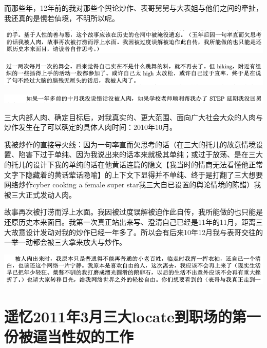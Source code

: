 \documentclass[9pt, b5paper]{article}
\begin{document}
而那些年，12年前的我对那些个舆论炒作、表哥舅舅与大表姐与他们之间的牵扯，我还真的是愰若仙境，不明所以呢。

\begin{center}
\includegraphics[width=.9\linewidth]{./pic/p1p32-6.png}
\end{center}

\begin{center}
\includegraphics[width=.9\linewidth]{./pic/p1p40-2.png}
\end{center}

\begin{center}
\includegraphics[width=.9\linewidth]{./pic/p1p70-1.png}
\end{center}

三大内部人肉、确定目标后，对我真实的、更大范围、面向广大社会大众的人肉与炒作发生在了可以确定的具体人肉时间：2010年10月。

我被炒作的直接导火线：因为一句率直而欠思考的话（在三大的托儿的故意情境设置、陷害下过于单纯、因为我说出来的话本来就极其单纯；或过于放荡、是在三大的托儿的设计下我的单纯的话在他黄话连篇的隐文【我当时的情商无法看懂他正常文字下隐藏着的黄话荤话隐喻】的上下文下显得并不单纯、终于是打翻了三大想要网络炒作cyber cooking a female super star我三大自已设置的舆论情境的陈醋）我被三大正式发动人肉。

故事再次被打涝而浮上水面。我因被过度误解被迫作此自传，我所能做的也只能是还原历史本来面目。我第一次真正站出来写、澄清自己已经是11年的11月，距离三大故意设计发动对我的炒作已经一年多了。所以会有后来10年12月我与表哥交往的一举一动都会被三大拿来放大与炒作。 

\begin{center}
\includegraphics[width=.9\linewidth]{./pic/p1p165.png}
\end{center}

\section{遥忆2011年3月三大locate到职场的第一份被逼当性奴的工作}
\label{sec:org0eda9f2}
\end{document}
